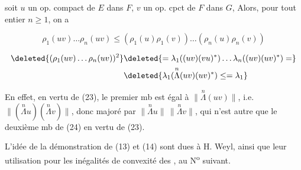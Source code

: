  soit $u$ un op. compact de $E$ dans $F$, $v$ un op. cpct de $F$ dans $G$,  Alors, pour tout entier $n\geq1$, on a

\[
\rho_1(uv)\ldots\rho_n(uv)\leq(\rho_1(u)\rho_1(v))\ldots(\rho_n(u)\rho_n(v))\tag*{(24)}
\]


\[
\begin{aligned}
\deleted{(\rho_1(uv)\ldots\rho_n(uv))^2}&\deleted{=\lambda_1((uv)(vu)^*)\ldots\lambda_n((uv)(uv)^*)=}\\
&\deleted{\lambda_1(\overset{n}{\Lambda}(uv)(uv)^*)\leq=\lambda_1}
\end{aligned}
\]

En effet, en vertu de  (23), le premier mb est égal à $\lVert\overset{n}{\Lambda}(uv)\rVert$, i.e. $\lVert(\overset{n}{\Lambda}u)(\overset{n}{\Lambda}v)\rVert$,  donc majoré par $\lVert\overset{n}{\Lambda}u\rVert\,\lVert\overset{n}{\Lambda}v\rVert$, qui n'est autre que le deuxième mb de (24) en vertu de (23).

L'idée de la démonstration de (13) et (14) sont dues à H. Weyl, ainsi que leur utilisation pour les inégalités de convexité des , au \deleted{\S} N\textsuperscript{o} suivant.
